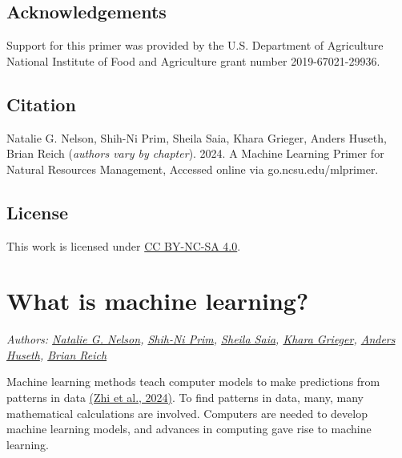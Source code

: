 \documentclass[
]{book}
\begin{document}
\hypertarget{acknowledgements}{%
\section{Acknowledgements}\label{acknowledgements}}

Support for this primer was provided by the U.S. Department of Agriculture National Institute of Food and Agriculture grant number 2019-67021-29936.

\hypertarget{citation}{%
\section{Citation}\label{citation}}

Natalie G. Nelson, Shih-Ni Prim, Sheila Saia, Khara Grieger, Anders Huseth, Brian Reich (\emph{authors vary by chapter}). 2024. A Machine Learning Primer for Natural Resources Management, Accessed online via go.ncsu.edu/mlprimer.

\hypertarget{license}{%
\section{License}\label{license}}

This work is licensed under \href{https://creativecommons.org/licenses/by-nc-sa/4.0/?ref=chooser-v1}{CC BY-NC-SA 4.0}.

\hypertarget{what-is-machine-learning}{%
\chapter{What is machine learning?}\label{what-is-machine-learning}}

\emph{Authors: \href{https://bae.ncsu.edu/people/nnelson4/}{Natalie G. Nelson}, \href{https://www.linkedin.com/in/shih-ni-prim-14033336/}{Shih-Ni Prim}, \href{https://sheilasaia.rbind.io/}{Sheila Saia}, \href{https://cals.ncsu.edu/applied-ecology/people/kdgriege/}{Khara Grieger}, \href{https://cals.ncsu.edu/entomology-and-plant-pathology/people/ashuseth/}{Anders Huseth}, \href{https://statistics.sciences.ncsu.edu/people/bjreich/}{Brian Reich}}

Machine learning methods teach computer models to make predictions from patterns in data \href{https://doi.org/10.1038/s44221-024-00202-z}{(Zhi et al., 2024)}. To find patterns in data, many, many mathematical calculations are involved. Computers are needed to develop machine learning models, and advances in computing gave rise to machine learning.
\end{document}
